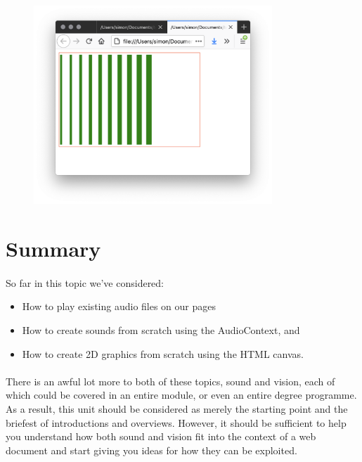 \begin{figure}[H]
\centering
\includegraphics[width=0.8\textwidth]{figures/canvas-lines}
\label{fig:canvas-lines}
\caption{}
\end{figure}


\section{Summary}
\paragraph{} So far in this topic we've considered:

\begin{itemize}
\item How to play existing audio files on our pages
\item How to create sounds from scratch using the AudioContext, and
\item How to create 2D graphics from scratch using the HTML canvas.
\end{itemize}

\paragraph{} There is an awful lot more to both of these topics, sound and vision, each of which could be covered in an entire module, or even an entire degree programme. As a result, this unit should be considered as merely the starting point and the briefest of introductions and overviews. However, it should be sufficient to help you understand how both sound and vision fit into the context of a web document and start giving you ideas for how they can be exploited.

